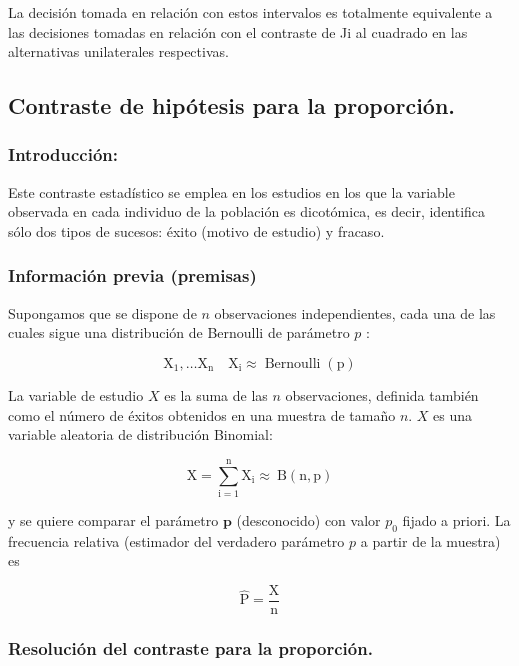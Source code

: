 \documentclass[
]{article}
\begin{document}
La decisión tomada en relación con estos intervalos es totalmente equivalente a las decisiones tomadas en relación con el contraste de Ji al cuadrado en las alternativas unilaterales respectivas.

\subsection{Contraste de hipótesis para la proporción.}\label{contraste-de-hipuxf3tesis-para-la-proporciuxf3n.}

\subsubsection{Introducción:}\label{introducciuxf3n-6}

Este contraste estadístico se emplea en los estudios en los que la variable observada en cada individuo de la población es dicotómica, es decir, identifica sólo dos tipos de sucesos: éxito (motivo de estudio) y fracaso.

\subsubsection{Información previa (premisas)}\label{informaciuxf3n-previa-premisas-1}

Supongamos que se dispone de \(n\) observaciones independientes, cada una de las cuales sigue una distribución de Bernoulli de parámetro \(p\) :

\[
\mathrm{X}_{1}, \ldots \mathrm{X}_{\mathrm{n}} \quad \mathrm{X}_{\mathrm{i}} \approx \operatorname{Bernoulli}(\mathrm{p})
\]

La variable de estudio \(X\) es la suma de las \(n\) observaciones, definida también como el número de éxitos obtenidos en una muestra de tamaño \(n\).
\(X\) es una variable aleatoria de distribución Binomial:

\[
\mathrm{X}=\sum_{\mathrm{i}=1}^{\mathrm{n}} \mathrm{X}_{\mathrm{i}} \approx \mathrm{~B}(\mathrm{n}, \mathrm{p})
\]

y se quiere comparar el parámetro \(\boldsymbol{p}\) (desconocido) con valor \(p_{0}\) fijado a priori.
La frecuencia relativa (estimador del verdadero parámetro \(p\) a partir de la muestra) es

\[
\hat{\mathrm{P}}=\frac{\mathrm{X}}{\mathrm{n}}
\]

\subsubsection{Resolución del contraste para la proporción.}\label{resoluciuxf3n-del-contraste-para-la-proporciuxf3n.}
\end{document}
